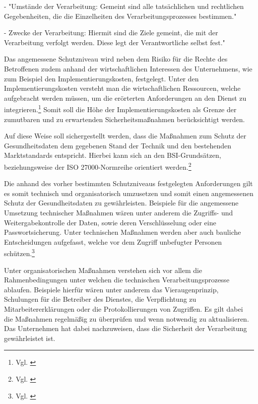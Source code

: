 - "Umstände der Verarbeitung: Gemeint sind alle tatsächlichen und rechtlichen Gegebenheiten, die die Einzelheiten des Verarbeitungsprozesses bestimmen."

- Zwecke der Verarbeitung: Hiermit sind die Ziele gemeint, die mit der Verarbeitung verfolgt werden. Diese legt der Verantwortliche selbst fest."

Das angemessene Schutzniveau wird neben dem Risiko für die Rechte des Betroffenen zudem anhand der wirtschaftlichen Interessen des Unternehmens, wie zum Beispiel den Implementierungskosten, festgelegt. Unter den Implementierungskosten versteht man die wirtschaftlichen Ressourcen, welche aufgebracht werden müssen, um die erörterten Anforderungen an den Dienst zu integrieren.\footnote{Vgl. \cite[S. 42 f.]{OrientierungshilfezumGesundheitsdatenschutz2018}} Somit soll die Höhe der Implementierungskosten als Grenze der zumutbaren und zu erwartenden Sicherheitsmaßnahmen berücksichtigt werden.

Auf diese Weise soll sichergestellt werden, dass die Maßnahmen zum Schutz der Gesundheitsdaten dem gegebenen Stand der Technik und den bestehenden Marktstandards entspricht. Hierbei kann sich an den BSI-Grundsätzen, beziehungsweise der ISO 27000-Normreihe orientiert werden.\footnote{Vgl. \cite[S. 42 f.]{OrientierungshilfezumGesundheitsdatenschutz2018}}

Die anhand des vorher bestimmten Schutzniveaus festgelegten Anforderungen gilt es somit technisch und organisatorisch umzusetzen und somit einen angemessenen Schutz der Gesundheitsdaten zu gewährleisten. Beispiele für die angemessene Umsetzung technischer Maßnahmen wären unter anderem die Zugriffs- und Weitergabekontrolle der Daten, sowie deren Verschlüsselung oder eine Passwortsicherung. Unter technischen Maßnahmen werden aber auch bauliche Entscheidungen aufgefasst, welche vor dem Zugriff unbefugter Personen schützen.\footnote{Vgl. \cite[S. 41 ff.]{OrientierungshilfezumGesundheitsdatenschutz2018}}

Unter organisatorischen Maßnahmen verstehen sich vor allem die Rahmenbedingungen unter welchen die technischen Verarbeitungsprozesse ablaufen. Beispiele hierfür wären unter anderem das Vieraugenprinzip, Schulungen für die Betreiber des Dienstes, die Verpflichtung zu Mitarbeitererklärungen oder die Protokollierungen von Zugriffen. Es gilt dabei die Maßnahmen regelmäßig zu überprüfen und wenn notwendig zu aktualisieren. Das Unternehmen hat dabei nachzuweisen, dass die Sicherheit der Verarbeitung gewährleistet ist. 

